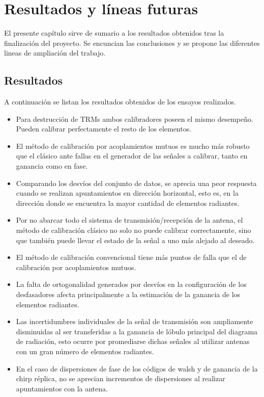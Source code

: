 \chapter{Resultados y líneas futuras}

El presente capítulo sirve de sumario a los resultados obtenidos tras la finalización del proyecto. Se encuncian las 
conclusiones y se propone las diferentes lineas de ampliación del trabajo.

\section{Resultados}

A continuación se listan los resultados obtenidos de los ensayos realizados.
\begin{itemize}
	\item Para destrucción de TRMs ambos calibradores poseen el mismo desempeño. Pueden calibrar perfectamente el resto de los 
		elementos.
	\item El método de calibración por acoplamientos mutuos es mucho más robusto que el clásico ante fallas en el generador 
		de las señales a calibrar, tanto en ganancia como en fase.
	\item Comparando los desvíos del conjunto de datos, se aprecia una peor respuesta cuando se realizan apuntamientos 
		en dirección horizontal, esto es, en la dirección donde se encuentra la mayor cantidad de elementos radiantes.
	\item Por no abarcar todo el sistema de transmisión/recepción de la antena, el método de calibración clásico no solo no 
		puede calibrar correctamente, sino que también puede llevar el estado de la señal a uno más alejado al deseado.
	\item El método de calibración convencional tiene más puntos de falla que el de calibración por acoplamientos mutuos.
	\item La falta de ortogonalidad generados por desvíos en la configuración de los desfasadores afecta principalmente a la 
		estimación de la ganancia de los elementos radiantes.
	\item Las incertidumbres individuales de la señal de transmisión son ampliamente disminuidas al ser transferidas a la 
		ganancia de lóbulo principal del diagrama de radiación, esto ocurre por promediarse dichas señales al utilizar antenas 
		con un gran número de elementos radiantes.
	\item En el caso de dispersiones de fase de los códigos de walsh y de ganancia de la chirp réplica, no se aprecian incrementos
		de dispersiones al realizar apuntamientos con la antena.
\end{itemize}

